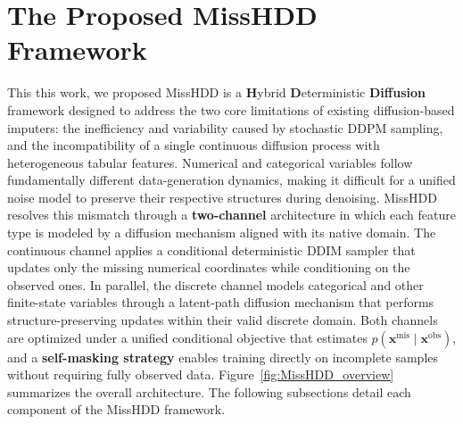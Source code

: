 \documentclass[times, review, 10pt]{elsarticle}
\begin{document}

\section{The Proposed MissHDD Framework}

This this work, we proposed MissHDD is a \textbf{H}ybrid \textbf{D}eterministic \textbf{Diffusion} framework designed to address the two core limitations of existing diffusion-based imputers: the inefficiency and variability caused by stochastic DDPM sampling, and the incompatibility
of a single continuous diffusion process with heterogeneous tabular
features. Numerical and categorical variables follow fundamentally different
data-generation dynamics, making it difficult for a unified noise model to
preserve their respective structures during denoising. MissHDD resolves this
mismatch through a \textbf{two-channel} architecture in which each feature type is
modeled by a diffusion mechanism aligned with its native domain. The continuous channel applies a conditional deterministic DDIM sampler that updates only the missing numerical coordinates while conditioning on the observed ones. In parallel, the discrete channel models categorical and other
finite-state variables through a latent-path diffusion mechanism that performs
structure-preserving updates within their valid discrete domain. Both channels are optimized under a unified conditional objective that
estimates \(p(\mathbf{x}^{\mathrm{mis}} \mid \mathbf{x}^{\mathrm{obs}})\), and a
\textbf{self-masking strategy} enables training directly on incomplete samples without
requiring fully observed data. Figure~\ref{fig:MissHDD_overview} summarizes
the overall architecture. The following subsections detail each component of
the MissHDD framework.
\end{document}
